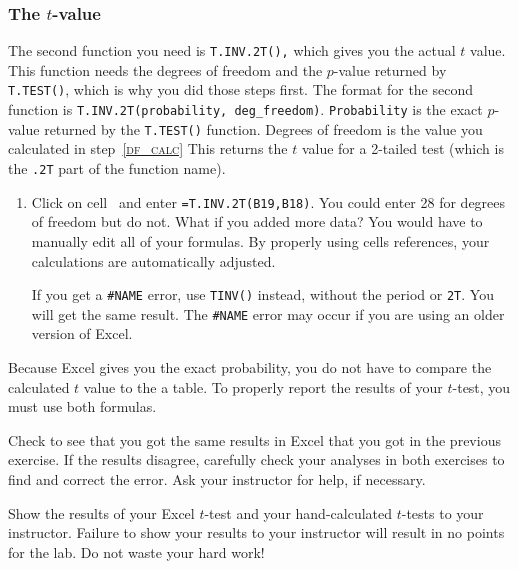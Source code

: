 \documentclass[12pt]{exam}
\newcommand*\xcell[1]{cell~\liningnum{#1}}
\begin{document}
\subsubsection*{The $t$-value}

The second function you need is \texttt{T.INV.2T(),} which gives you the actual $t$ value. This function needs the degrees of freedom and the $p$-value returned by \texttt{T.TEST()}, which is why you did those steps first. The format for the second function is \texttt{T.INV.2T(probability, deg\_freedom)}. \texttt{Probability} is the exact $p$-value returned by the \texttt{T.TEST()} function. Degrees of freedom is the value you calculated in step~\textsc{\ref{df_calc}} This returns the $t$ value for a 2-tailed test (which is the \texttt{.2T} part of the function name).

\begin{enumerate}[resume]
	\item Click on \xcell{B20} and enter \texttt{=T.INV.2T(B19,B18)}. You could enter 28 for degrees of freedom but do not. What if you added more data? You would have to manually edit all of your formulas. By properly using cells references, your calculations are automatically adjusted. 
	
	If you get a \texttt{\#NAME} error, use \texttt{TINV()} instead, without the period or \texttt{2T}. You will get the same result. The \texttt{\#NAME} error may occur if you are using an older version of Excel. 
\end{enumerate}
	
Because Excel gives you the exact probability, you do not have to compare the calculated $t$ value to the a table. To properly report the results of your $t$-test, you must use both formulas. 

\begin{questions}

\question
Check to see that you got the same results in Excel that you got in the previous exercise. If the results disagree, carefully check your analyses in both exercises to find and correct the error. Ask your instructor for help, if necessary.

\question[Checkout]
Show the results of your Excel $t$-test and your hand-calculated $t$-tests to your instructor. Failure to show your results to your instructor will result in no points for the lab. Do not waste your hard work!

\end{questions}
\end{document}
